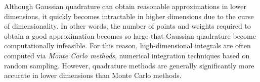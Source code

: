 \begin{info}
Although Gaussian quadrature can obtain reasonable approximations in lower dimensions, it quickly becomes intractable in higher dimensions due to the curse of dimensionality.
In other words, the number of points and weights required to obtain a good approximation becomes so large that Gaussian quadrature become computationally infeasible.
For this reason, high-dimensional integrals are often computed via \emph{Monte Carlo methods}, numerical integration techniques based on random sampling.
However, quadrature methods are generally significantly more accurate in lower dimensions than Monte Carlo methods.
\end{info}
